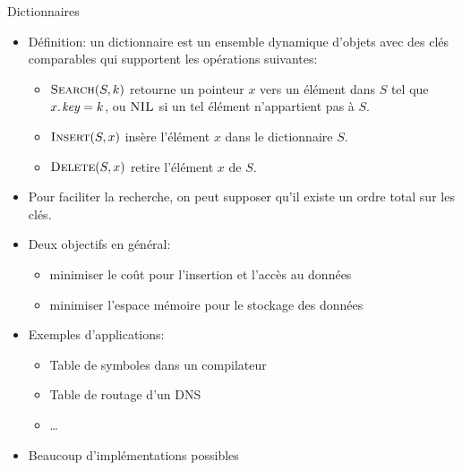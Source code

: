 \begin{frame}{Dictionnaires}
\begin{itemize}
\item Définition: un \alert{dictionnaire} est un ensemble dynamique
  d'objets avec des clés comparables qui supportent les opérations
  suivantes:
\begin{itemize}
\item $\textnormal{\scshape Search}(S,k)$ retourne un pointeur $x$ vers un élément dans $S$ tel que $\attrib{x}{key}=k$, ou $\textnormal{\scshape NIL}$ si un tel élément n'appartient pas à $S$.
\item $\textnormal{\scshape Insert}(S,x)$ insère l'élément $x$ dans le dictionnaire $S$.
\item $\textnormal{\scshape Delete}(S,x)$ retire l'élément $x$ de $S$.
\end{itemize}
\item Pour faciliter la recherche, on peut supposer qu'il existe un ordre total sur les clés.
\item Deux objectifs en général:
\begin{itemize}
\item minimiser le coût pour l'insertion et l'accès au données
\item minimiser l'espace mémoire pour le stockage des données
\end{itemize}
\item Exemples d'applications:
\begin{itemize}
\item Table de symboles dans un compilateur
\item Table de routage d'un DNS
\item \ldots
\end{itemize}
\item Beaucoup d'implémentations possibles
\end{itemize}
\end{frame}

